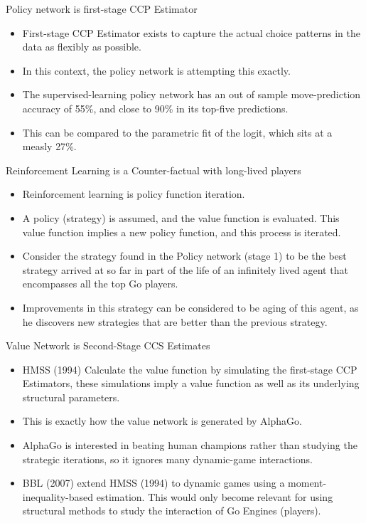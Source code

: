 \documentclass[presentation]{beamer}
\begin{document}
\begin{frame}[label={sec:org7ed9d39}]{Policy network is first-stage CCP Estimator}
\begin{itemize}
\item First-stage CCP Estimator exists to capture the actual choice
patterns in the data as flexibly as possible.
\item In this context, the policy network is attempting this exactly.
\item The supervised-learning policy network has an out of sample
move-prediction accuracy of 55\%, and close to 90\% in its top-five
predictions.
\item This can be compared to the parametric fit of the logit, which sits
at a measly 27\%.
\end{itemize}
\end{frame}


\begin{frame}[label={sec:orge1002c7}]{Reinforcement Learning is a Counter-factual with long-lived players}
\begin{itemize}
\item Reinforcement learning is policy function iteration.
\item A policy (strategy) is assumed, and the value function is
evaluated. This value function implies a new policy function, and
this process is iterated.
\item Consider the strategy found in the Policy network (stage 1) to
be the best strategy arrived at so far in part of the life of an
infinitely lived agent that encompasses all the top Go players.
\item Improvements in this strategy can be considered to be aging of this
agent, as he discovers new strategies that are better than the
previous strategy.
\end{itemize}
\end{frame}

\begin{frame}[label={sec:org9f67d3d}]{Value Network is Second-Stage CCS Estimates}
\begin{itemize}
\item HMSS (1994) Calculate the value function by simulating the
first-stage CCP Estimators, these simulations imply a value function
as well as its underlying structural parameters.
\item This is exactly how the value network is generated by AlphaGo.
\item AlphaGo is interested in beating human champions rather than
studying the strategic iterations, so it ignores many dynamic-game
interactions.
\item BBL (2007) extend HMSS (1994) to dynamic games using a
moment-inequality-based estimation. This would only become relevant
for using structural methods to study the interaction of Go Engines
(players).
\end{itemize}
\end{frame}
\end{document}
